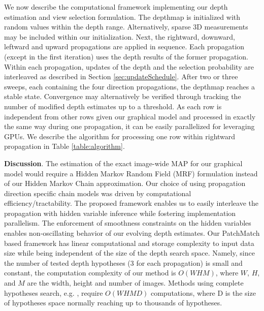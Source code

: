 We now describe the computational framework implementing our  depth estimation and view selection formulation.
The depthmap is initialized with random values within the depth range. Alternatively, sparse 3D measurements may be included within our initialization. Next, the rightward, downward, leftward and upward propagations are applied in sequence. Each propagation (except in the first iteration) uses the depth results of the former propagation. Within each propagation, updates of the depth and the selection probability are interleaved as described in Section \ref{sec:updateSchedule}. After two or three sweeps, each containing the four direction propagations, the depthmap reaches a stable state.  Convergence may alternatively be verified through tracking the number of modified depth estimates up to a threshold. As each row is independent from other rows given our graphical model and processed in exactly the same way during one propagation, it can be easily parallelized for leveraging GPUs. We describe the algorithm for processing one row within rightward propagation in Table \ref{table:algorithm}.



{\bf Discussion}.
The estimation of the exact image-wide MAP for our graphical model would require a Hidden Markov Random Field (MRF) formulation instead of our Hidden Markov Chain approximation.
Our choice of using propagation direction specific chain models was driven by computational efficiency/tractability.
The proposed framework enables us to easily interleave the propagation with hidden variable inference while fostering implementation  parallelism.
The enforcement of smoothness constraints on the hidden variables  enables non-oscillating behavior of our evolving depth estimates.
Our PatchMatch based  framework has linear computational and storage complexity \wrt to input data size while being independent of the size of the depth search space.
Namely, since the number of tested depth hypotheses (3 for each propagation) is small and constant, the computation complexity of our method is $O(W H M)$, where $W$, $H$, and $M$ are the width, height and  number of images.  Methods using complete hypotheses search, e.g. \cite{Sun_ECCV2002_stereoBeliefProp, CombinedDepthOutlier}, require  $O(W H M D)$ computations, where D is the size of hypotheses space
normally reaching up to thousands of hypotheses.
 
